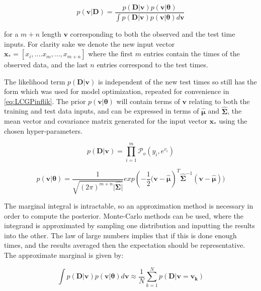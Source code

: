 \documentclass[a4paper,11pt]{report}
\begin{document}
\begin{equation}
p(\mathbf{v | D}) = \frac{p(\mathbf{D|v})p(\mathbf{v}|\boldsymbol{\theta}) }{\int{p(\mathbf{D|v})p(\mathbf{v}|\boldsymbol{\theta}) d\mathbf{v}}}\end{equation}

for a \(m+n\) length \(\mathbf{v}\) corresponding to both the observed and the test time inputs. For clarity sake we denote the new input vector \(\mathbf{x_*} = [x_i,....x_m,...,x_{m+n}]\) where the first \(m\) entries contain the times of the observed data, and the last \(n\) entries correspond to the test times. \par

The likelihood term \(p(\mathbf{D|v})\) is independent of the new test times so still has the form which was used for model optimization, repeated for convenience in \ref{eq:LCGPinflik}. The prior \(p(\mathbf{v}|\boldsymbol{\theta})\) will contain terms of \(\mathbf{v}\) relating to both the training and test data inputs, and can be expressed in terms of \(\hat{\boldsymbol{\mu}}\) and \(\hat{\boldsymbol{\Sigma}}\), the mean vector and covariance matrix generated for the input vector \(\mathbf{x_*}\) using the chosen hyper-parameters.

\singlespacing
\begin{equation} \label{eq:LCGPinflik}
p(\mathbf{D|v}) = \prod_{i=1}^{m} \mathcal{P}_o (y_i, e^{v_i})
\end{equation}

\begin{equation}
p(\mathbf{v}|\boldsymbol{\theta}) = \frac{1}{\sqrt{(2\pi)^{m+n} |\hat{\boldsymbol{\Sigma|}}}} exp(- \frac{1}{2} \mathbf{(v}-\hat{\boldsymbol{\mu}})^{T}\hat{\boldsymbol{\Sigma}}^{-1}(\mathbf{v}-\hat{\boldsymbol{\mu}}))
\end{equation}
\doublespacing

The marginal integral is intractable, so an approximation method is necessary in order to compute the posterior. Monte-Carlo methods can be used, where the integrand is approximated by sampling one distribution and inputting the results into the other. The law of large numbers implies that if this is done enough times, and the results averaged then the expectation should be representative. The approximate marginal is given by:

\begin{equation}
\int{p(\mathbf{D|v})p(\mathbf{v}|\boldsymbol{\theta}) d\mathbf{v}} \approx \frac{1}{N} \displaystyle \sum_{k=1}^{N} p(\mathbf{D|v=v_k})
\end{equation}
\end{document}
